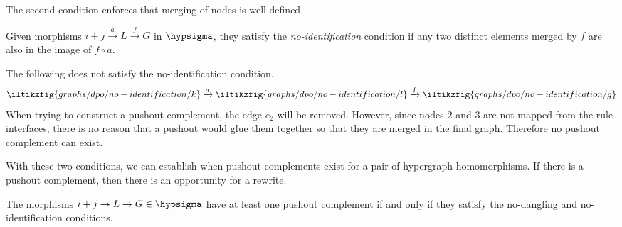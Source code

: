 The second condition enforces that merging of nodes is well-defined.

\begin{definition}
    Given morphisms \(i+j \xrightarrow{a} L \xrightarrow{f} G\) in
    \(\hypsigma\), they satisfy the \emph{no-identification} condition if any
    two distinct elements merged by \(f\) are also in the image of \(f \circ a\).
\end{definition}

\begin{example}
    The following does not satisfy the no-identification
    condition.
    \[
        \iltikzfig{graphs/dpo/no-identification/k}
        \xrightarrow{a}
        \iltikzfig{graphs/dpo/no-identification/l}
        \xrightarrow{f}
        \iltikzfig{graphs/dpo/no-identification/g}
    \]
    When trying to construct a pushout complement, the edge \(e_2\) will be
    removed.
    However, since nodes \(2\) and \(3\) are not mapped from the rule
    interfaces, there is no reason that a pushout would glue them together so
    that they are merged in the final graph.
    Therefore no pushout complement can exist.
    \begin{center}
    \end{center}
\end{example}

With these two conditions, we can establish when pushout complements exist for
a pair of hypergraph homomorphisms.
If there is a pushout complement, then there is an opportunity for a rewrite.

\begin{proposition}
    \label{prop:pushout-complement}
    The morphisms \(i+j \to L \to G \in \hypsigma\) have at least one pushout
    complement if and only if they satisfy the no-dangling and no-identification
    conditions.
\end{proposition}

